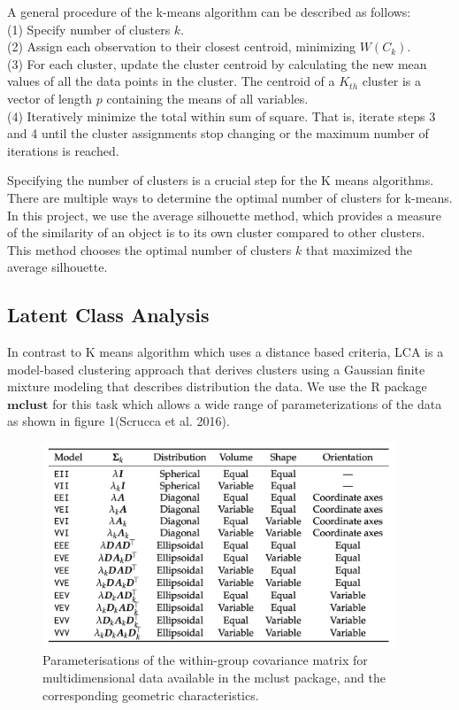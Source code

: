 \documentclass[
]{article}
\begin{document}
A general procedure of the k-means algorithm can be described as
follows:\\
(1) Specify number of clusters \(k\).\\
(2) Assign each observation to their closest centroid, minimizing
\(W(C_k)\).\\
(3) For each cluster, update the cluster centroid by calculating the new
mean values of all the data points in the cluster. The centroid of a
\(K_{th}\) cluster is a vector of length \(p\) containing the means of
all variables.\\
(4) Iteratively minimize the total within sum of square. That is,
iterate steps 3 and 4 until the cluster assignments stop changing or the
maximum number of iterations is reached.

Specifying the number of clusters is a crucial step for the K means
algorithms. There are multiple ways to determine the optimal number of
clusters for k-means. In this project, we use the average silhouette
method, which provides a measure of the similarity of an object is to
its own cluster compared to other clusters. This method chooses the
optimal number of clusters \(k\) that maximized the average silhouette.

\hypertarget{latent-class-analysis}{%
\subsection{Latent Class Analysis}\label{latent-class-analysis}}

In contrast to K means algorithm which uses a distance based criteria,
LCA is a model-based clustering approach that derives clusters using a
Gaussian finite mixture modeling that describes distribution the data.
We use the R package \(\textbf{mclust}\) for this task which allows a
wide range of parameterizations of the data as shown in figure 1(Scrucca
et al. 2016).

\begin{figure}
\centering
\includegraphics[width=4.16667in,height=\textheight]{report_image/mclust_table}
\caption{Parameterisations of the within-group covariance matrix for
multidimensional data available in the mclust package, and the
corresponding geometric characteristics.}
\end{figure}
\end{document}
